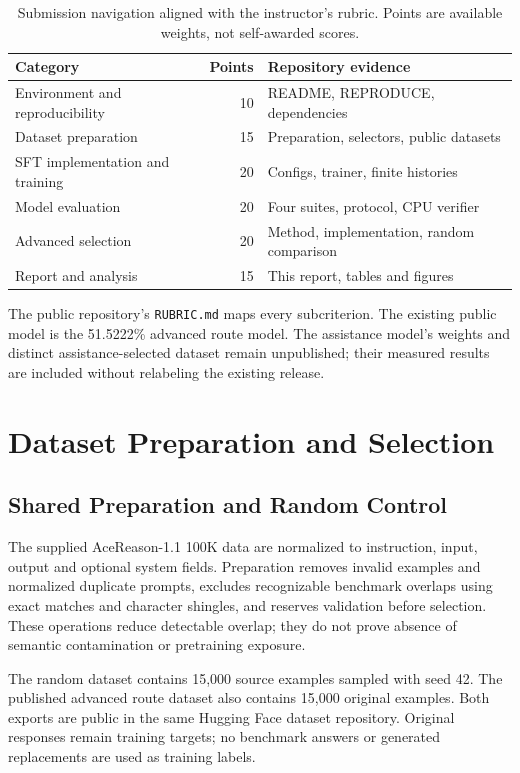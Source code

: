 \documentclass[10pt,letterpaper]{article}
\begin{document}
\begin{table}[H]\centering\small
\caption{Submission navigation aligned with the instructor's rubric. Points are available weights, not self-awarded scores.}
\begin{tabular}{p{.42\linewidth}rp{.39\linewidth}}\toprule
Category & Points & Repository evidence\\\midrule
Environment and reproducibility & 10 & README, REPRODUCE, dependencies\\
Dataset preparation & 15 & Preparation, selectors, public datasets\\
SFT implementation and training & 20 & Configs, trainer, finite histories\\
Model evaluation & 20 & Four suites, protocol, CPU verifier\\
Advanced selection & 20 & Method, implementation, random comparison\\
Report and analysis & 15 & This report, tables and figures\\\bottomrule
\end{tabular}
\end{table}
The public repository's \texttt{RUBRIC.md} maps every subcriterion. The existing public model is the 51.5222\% advanced route model. The assistance model's weights and distinct assistance-selected dataset remain unpublished; their measured results are included without relabeling the existing release.

\newpage
\section{Dataset Preparation and Selection}
\subsection{Shared Preparation and Random Control}
The supplied AceReason-1.1 100K data are normalized to instruction, input, output and optional system fields. Preparation removes invalid examples and normalized duplicate prompts, excludes recognizable benchmark overlaps using exact matches and character shingles, and reserves validation before selection. These operations reduce detectable overlap; they do not prove absence of semantic contamination or pretraining exposure.

The random dataset contains 15,000 source examples sampled with seed 42. The published advanced route dataset also contains 15,000 original examples. Both exports are public in the same Hugging Face dataset repository. Original responses remain training targets; no benchmark answers or generated replacements are used as training labels.
\end{document}
